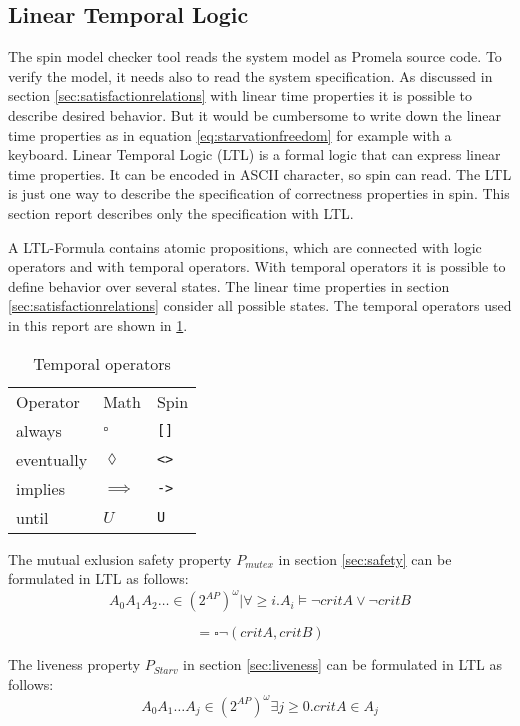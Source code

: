 \documentclass[a4paper, twoside]{article}
\begin{document}
\subsection{Linear Temporal Logic}
\label{sec:lineartemporallogic}

The spin model checker tool reads the system model as Promela source code. To verify the model, it needs also to read the system specification. As discussed in section \ref{sec:satisfactionrelations} with linear time properties it is possible to describe desired behavior. But it would be cumbersome to write down the linear time properties as in equation \ref{eq:starvationfreedom} for example with a keyboard. Linear Temporal Logic (LTL) is a formal logic that can express linear time properties. It can be encoded in ASCII character, so spin can read. The LTL is just one way to describe the specification of correctness properties in spin. This section report describes only the specification with LTL.

A LTL-Formula contains atomic propositions, which are connected with logic operators and with temporal operators. With temporal operators it is possible to define behavior over several states. The linear time properties in section \ref{sec:satisfactionrelations} consider all possible states. The temporal operators used in this report are shown in \ref{tab:temporal_operators}.

\begin{table}
  \centering
  \begin{tabular}{l l l}
    Operator & Math & Spin \\
    always & $\square$ & \verb|[]| \\
    eventually & $\lozenge$ & \verb|<>| \\
    implies & $\implies$ & \verb|->| \\
    until & $U$ & \verb|U|
  \end{tabular}
  \caption{Temporal operators }
  \label{tab:temporal_operators}
\end{table}

The mutual exlusion safety property $P_{mutex}$ in section \ref{sec:safety} can be formulated in LTL as follows:
\[
  {A_0 A_1 A_2 \dots \in (2^{AP})^{\omega} | \forall \geq i.   A_i \models \neg critA \lor \neg critB}
\]

\[
= \square \neg (critA,critB)
\]

The liveness property $P_{Starv}$ in section \ref{sec:liveness} can be formulated in LTL as follows:
\[
 { A_0 A_1 \dots A_j \in (2^{AP})^{\omega} \exists j \geq 0. critA \in A_j}
\]
\end{document}
